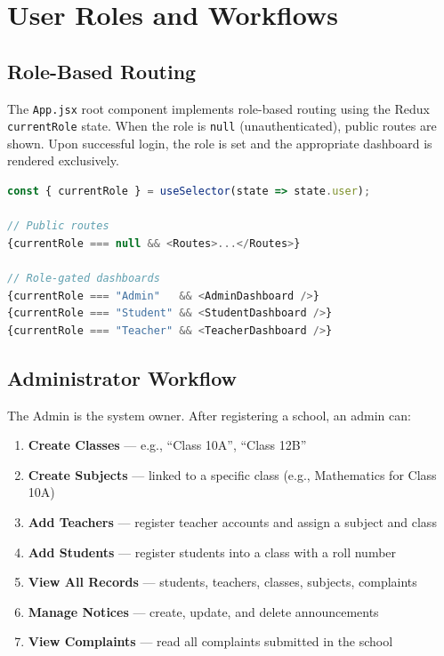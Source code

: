 \documentclass[12pt,a4paper]{report}
\begin{document}
\chapter{User Roles and Workflows}

\section{Role-Based Routing}

The \texttt{App.jsx} root component implements role-based routing using the Redux \texttt{currentRole} state. When the role is \texttt{null} (unauthenticated), public routes are shown. Upon successful login, the role is set and the appropriate dashboard is rendered exclusively.

\begin{lstlisting}[language=JavaScript, caption=App.jsx role-based routing logic]
const { currentRole } = useSelector(state => state.user);

// Public routes
{currentRole === null && <Routes>...</Routes>}

// Role-gated dashboards
{currentRole === "Admin"   && <AdminDashboard />}
{currentRole === "Student" && <StudentDashboard />}
{currentRole === "Teacher" && <TeacherDashboard />}
\end{lstlisting}

\section{Administrator Workflow}

The Admin is the system owner. After registering a school, an admin can:

\begin{enumerate}[leftmargin=2em]
  \item \textbf{Create Classes} --- e.g., ``Class 10A'', ``Class 12B''
  \item \textbf{Create Subjects} --- linked to a specific class (e.g., Mathematics for Class 10A)
  \item \textbf{Add Teachers} --- register teacher accounts and assign a subject and class
  \item \textbf{Add Students} --- register students into a class with a roll number
  \item \textbf{View All Records} --- students, teachers, classes, subjects, complaints
  \item \textbf{Manage Notices} --- create, update, and delete announcements
  \item \textbf{View Complaints} --- read all complaints submitted in the school
\end{enumerate}
\end{document}
